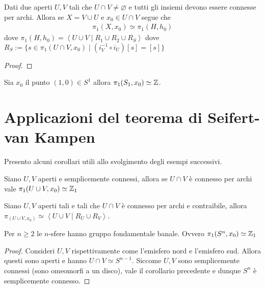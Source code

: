 \begin{theorem}
	Dati due aperti $U, V$ tali che $U \cap V \neq \varnothing$ e tutti gli insiemi devono essere connesse per archi. Allora se $X = V \cup U$ e $x_0 \in U\cap V$ segue che 
	\begin{equation}
	\begin{aligned}
		\pi_1(X, x_0) \simeq \pi_1(H, h_0)
	\end{aligned}
	\end{equation} 
	dove $\pi_1(H,h_0) = \left\langle U \cup V \mid R_1 \cup R_2 \cup R_S \right\rangle$ dove $R_S := \{s \in \pi_1(U \cap V,x_0) \mid (i^{-1}_V \circ i_{U}) \left[s\right] = \left[s\right]\}$ 
\end{theorem}
\begin{proof}
\end{proof}

\begin{theorem}
	Sia $x_0$ il punto $(1,0) \in S^1$ allora $\pi_1(S_1, x_0) \simeq \mathbb{Z}$.
\end{theorem}


\section{Applicazioni del teorema di Seifert-van Kampen}

Presento alcuni corollari utili allo svolgimento degli esempi successivi.

\begin{corollary}
	Siano $U,V$ aperti e semplicemente connessi, allora se $U \cap V$ è connesso per archi vale $\pi_1(U\cup V,x_0) \simeq \mathbb{Z}_1$ 
\end{corollary}

\begin{corollary}
	Siano $U,V$ aperti tali e tali che $U \cap V$ è connesso per archi e contraibile, allora $\pi_(U \cup V, x_0) \simeq \left\langle U \cup V \mid R_U \cup R_V\right\rangle$.
\end{corollary}


\begin{xca}
	Per $n \ge 2$ le $n$-sfere hanno gruppo fondamentale banale. Ovvero $\pi_1(S^n, x_0) \simeq \mathbb{Z}_1$
\end{xca}
\begin{proof}
	Consideri $U,V$ rispettivamente come l'emisfero nord e l'emisfero sud. Allora questi sono aperti e hanno $U \cap V \simeq S^{n-1}$. Siccome $U, V$ sono semplicemente connessi (sono omeomorfi a un disco), vale il corollario precedente e dunque $S^n$ è semplicemente connesso.  
\end{proof}


